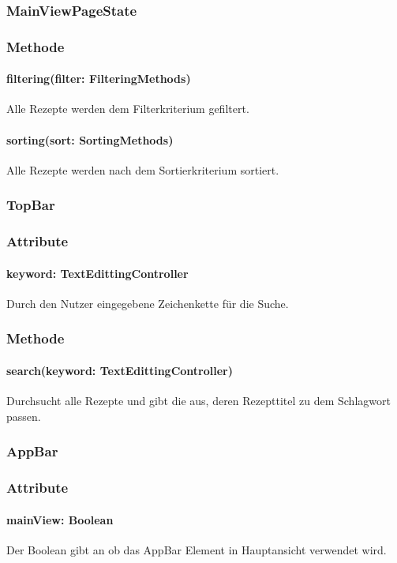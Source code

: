 \documentclass[parskip=full]{scrartcl}
\begin{document}
\subsubsection{MainViewPageState}
\subsubsection*{Methode}

\paragraph*{filtering(filter: FilteringMethods)} Alle Rezepte werden dem Filterkriterium gefiltert.
\paragraph*{sorting(sort: SortingMethods)} Alle Rezepte werden nach dem Sortierkriterium sortiert.

\subsubsection{TopBar}
\subsubsection*{Attribute}
\paragraph*{keyword: TextEdittingController} Durch den Nutzer eingegebene Zeichenkette für die Suche.

\subsubsection*{Methode}
\paragraph*{ search(keyword: TextEdittingController)} Durchsucht alle Rezepte und gibt die aus, deren Rezepttitel zu dem Schlagwort passen.


\subsubsection{AppBar} \label{sec:AppBar}
\subsubsection*{Attribute}
\paragraph*{mainView: Boolean} Der Boolean gibt an ob das AppBar Element in Hauptansicht verwendet wird.
\end{document}
